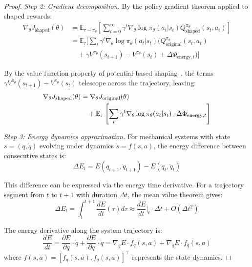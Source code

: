 \documentclass[journal]{IEEEtran}
\begin{document}
\begin{proof}
		\textit{Step 2: Gradient decomposition.}
		By the policy gradient theorem applied to shaped rewards:
		\begin{equation}
			\begin{split}
				\nabla_\theta J_{\text{shaped}}(\theta) &= \mathbb{E}_{\tau \sim \pi_\theta} \left[ \sum_{t=0}^{\infty} \gamma^t \nabla_\theta \log \pi_\theta(a_t|s_t) Q^{\pi_\theta}_{\text{shaped}}(s_t, a_t) \right] \\
				&= \mathbb{E}_{\tau} \bigg[ \sum_t \gamma^t \nabla_\theta \log \pi_\theta(a_t|s_t) \Big( Q^{\pi_\theta}_{\text{original}}(s_t,a_t) \\
				&\quad + \gamma V^{\pi_\theta}(s_{t+1}) - V^{\pi_\theta}(s_t) + \Delta\Phi_{\text{energy},t} \Big) \bigg]
			\end{split}
		\end{equation}
		
		By the value function property of potential-based shaping~\cite{ng1999policy}, the terms $\gamma V^{\pi_\theta}(s_{t+1}) - V^{\pi_\theta}(s_t)$ telescope across the trajectory, leaving:
		\begin{align}
			\nabla_\theta J_{\text{shaped}}(\theta) &= \nabla_\theta J_{\text{original}}(\theta) \notag\\
			&\quad + \mathbb{E}_{\tau} \left[ \sum_t \gamma^t \nabla_\theta \log \pi_\theta(a_t|s_t) \cdot \Delta\Phi_{\text{energy},t} \right]
			\label{eq:telescoping}
		\end{align}
		
		\textit{Step 3: Energy dynamics approximation.}
		For mechanical systems with state $s=(q,\dot{q})$ evolving under dynamics $\dot{s}=f(s,a)$, the energy difference between consecutive states is:
		\begin{equation}
			\Delta E_t = E(q_{t+1}, \dot{q}_{t+1}) - E(q_t, \dot{q}_t)
		\end{equation}
		
		This difference can be expressed via the energy time derivative. For a trajectory segment from $t$ to $t+1$ with duration $\Delta t$, the mean value theorem gives:
		\begin{equation}
			\Delta E_t = \int_{t}^{t+1} \frac{dE}{dt}(\tau) d\tau \approx \frac{dE}{dt}\Big|_{t} \cdot \Delta t + O(\Delta t^2)
		\end{equation}
		
		The energy derivative along the system trajectory is:
		\begin{equation}
			\frac{dE}{dt} = \frac{\partial E}{\partial q}\cdot\dot{q} + \frac{\partial E}{\partial\dot{q}}\cdot\ddot{q} = \nabla_q E \cdot f_q(s,a) + \nabla_{\dot{q}} E \cdot f_{\dot{q}}(s,a)
		\end{equation}
		where $f(s,a) = [f_q(s,a), f_{\dot{q}}(s,a)]^\top$ represents the state dynamics.
		

\end{proof}
\end{document}
